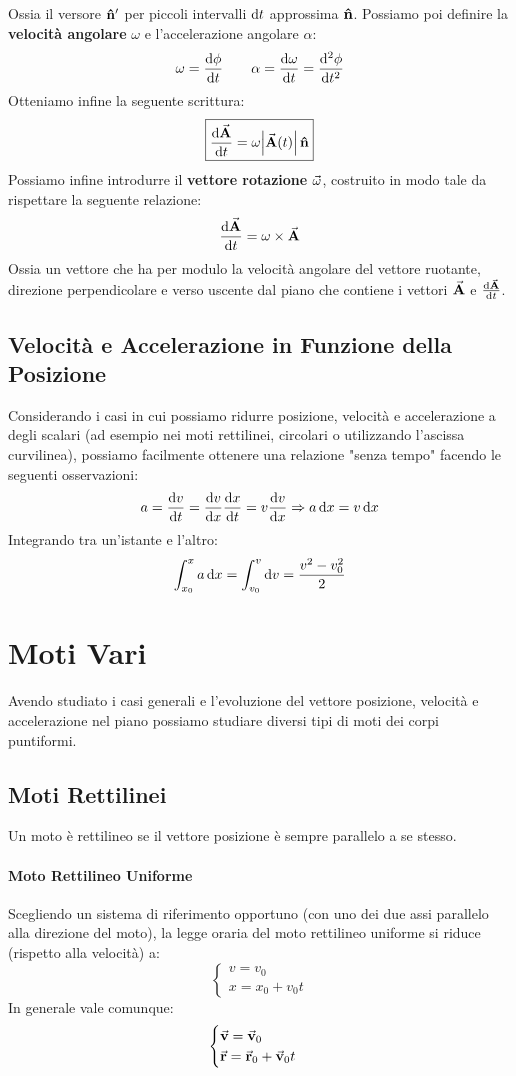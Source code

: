 \documentclass{report}
\newcommand{\then}{\ensuremath{\Rightarrow}}
\renewcommand{\v}{\va{v}}
\renewcommand{\r}{\va{r}}
\newcommand{\normvs}{\vu{n}}
\newcommand{\A}{\va{A}}
\begin{document}
Ossia il versore $\normvs'$ per piccoli intervalli $\dif t$ approssima $\normvs$.
Possiamo poi definire la \textbf{velocità angolare} $\omega$ e l'accelerazione angolare $\alpha$:
\[\omega=\dv{\phi}{t}\quad\quad\alpha=\dv{\omega}{t}=\dv[2]{\phi}{t}\]
Otteniamo infine la seguente scrittura:
\begin{equation}
    \boxed{\dv{\A}{t}=\omega\abs{\A(t)}\normvs}
\end{equation}
\hypertarget{vettoreruotante}{Possiamo infine introdurre il \textbf{vettore rotazione} $\va{\omega}$, costruito in modo tale da rispettare la seguente relazione}:
\[\dv{\A}{t}=\omega\times\A\]
Ossia un vettore che ha per modulo la velocità angolare del vettore ruotante, direzione perpendicolare e verso uscente dal piano che contiene i vettori $\A$ e $\dv{\A}{t}$.
\subsection{Velocità e Accelerazione in Funzione della Posizione}
Considerando i casi in cui possiamo ridurre posizione, velocità e accelerazione a degli scalari (ad esempio nei moti rettilinei, circolari o utilizzando l'ascissa curvilinea), possiamo facilmente ottenere una relazione "senza tempo" facendo le seguenti osservazioni:
\[a=\dv{v}{t}=\dv{v}{x}\dv{x}{t}=v\dv{v}{x}\then a\dif x=v\dif x\]
Integrando tra un'istante e l'altro:
\begin{equation}\label{parametraccelerazione}
\int_{x_0}^xa\dif x=\int_{v_0}^v\dif v=\frac{v^2-v_0^2}{2}
\end{equation}
\section{Moti Vari}
Avendo studiato i casi generali e l'evoluzione del vettore posizione, velocità e accelerazione nel piano possiamo studiare diversi tipi di moti dei corpi puntiformi.
\subsection{Moti Rettilinei}
Un moto è rettilineo se il vettore posizione è sempre parallelo a se stesso. 
\paragraph{Moto Rettilineo Uniforme}
Scegliendo un sistema di riferimento opportuno (con uno dei due assi parallelo alla direzione del moto), la legge oraria del moto rettilineo uniforme si riduce (rispetto alla velocità) a:
\begin{equation}
\begin{cases}
v=v_0\\
x=x_0+v_0t
\end{cases}
\end{equation}
In generale vale comunque:
\begin{equation}
\begin{cases}
\v=\v_0\\
\r=\r_0+\v_0t
\end{cases}
\end{equation}
\end{document}

